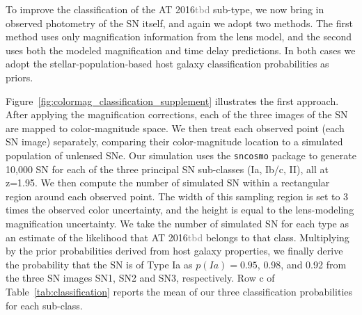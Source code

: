 \documentclass[12pt,dvipsnames]{article}
\def\SNABC{AT 2016{\textcolor{Gray}{tbd}}\xspace}
\begin{document}
To improve the classification of the \SNABC sub-type, we now bring in observed photometry of the SN itself, and again we adopt two methods.  The first method uses only magnification information from the lens model, and the second uses both the modeled magnification and time delay predictions.  In both cases we adopt the stellar-population-based host galaxy classification probabilities as priors.

Figure~\ref{fig:colormag_classification_supplement} illustrates the first approach.  After applying the magnification corrections, each of the three images of the SN are mapped to color-magnitude space.  We then treat each observed point (each SN image) separately, comparing their color-magnitude location to a simulated population of unlensed SNe.  Our simulation uses the {\tt sncosmo} package \cite{barbary_sncosmo_2016}  to generate 10,000 SN for each of the three principal SN sub-classes (Ia, Ib/c, II), all at z=1.95.  
We then compute the number of simulated SN within a rectangular region around each observed point. The width of this sampling region is set to 3 times the observed color uncertainty, and the height is equal to the lens-modeling magnification uncertainty.  We take the number of simulated SN for each type as an estimate of the likelihood that \SNABC belongs to that class. Multiplying by the prior probabilities derived from host galaxy properties, we finally derive the probability that the SN is of Type Ia as $p(Ia)=0.95$, 0.98, and 0.92 from the three SN images SN1, SN2 and SN3, respectively. Row c of Table~\ref{tab:classification} reports the mean of our three classification probabilities for each sub-class. 
\end{document}

